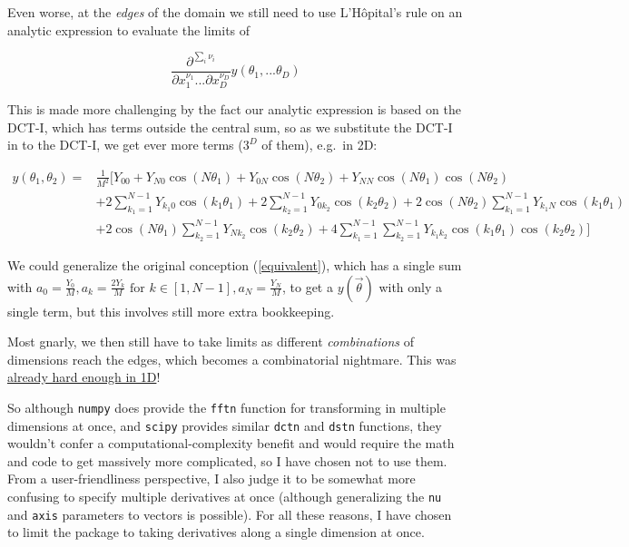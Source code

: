 \documentclass[10pt]{article}
\begin{document}
Even worse, at the \textit{edges} of the domain we still need to use L'Hôpital's rule on an analytic expression to evaluate the limits of

$$\frac{\partial^{\sum_i\nu_i}}{\partial x_1^{\nu_1} ... \partial x_D^{\nu_D}} y(\theta_1, ... \theta_D)$$

This is made more challenging by the fact our analytic expression is based on the DCT-I, which has terms outside the central sum, so as we substitute the DCT-I in to the DCT-I, we get ever more terms ($3^D$ of them), e.g.~in 2D:

\begin{align*}
y(\theta_1, \theta_2) =& \frac{1}{M^2} \Big[ Y_{00} + Y_{N0}\cos(N\theta_1) + Y_{0N}\cos(N\theta_2) + Y_{NN}\cos(N\theta_1)\cos(N\theta_2)\\
&+ 2\sum_{k_1 = 1}^{N-1} Y_{k_1 0} \cos(k_1 \theta_1) + 2\sum_{k_2 = 1}^{N-1} Y_{0 k_2} \cos(k_2 \theta_2) + 2\cos(N\theta_2) \sum_{k_1 = 1}^{N-1} Y_{k_1 N} \cos(k_1 \theta_1)\\
&+ 2\cos(N\theta_1) \sum_{k_2 = 1}^{N-1} Y_{N k_2} \cos(k_2 \theta_2) + 4 \sum_{k_1 = 1}^{N-1} \sum_{k_2 = 1}^{N-1} Y_{k_1 k_2} \cos(k_1 \theta_1) \cos(k_2 \theta_2)\Big]
\end{align*}

We could generalize the original conception (\autoref{equivalent}), which has a single sum with $a_0 = \frac{Y_0}{M}, a_k = \frac{2 Y_k}{M} \text{ for } k \in [1, N-1], a_N = \frac{Y_N}{M}$, to get a $y(\vec{\theta})$ with only a single term, but this involves still more extra bookkeeping.

Most gnarly, we then still have to take limits as different \textit{combinations} of dimensions reach the edges, which becomes a combinatorial nightmare. This was \hyperref[endpoints]{already hard enough in 1D}!

So although \texttt{numpy} does provide the \texttt{fftn} function for transforming in multiple dimensions at once, and \texttt{scipy} provides similar \texttt{dctn} and \texttt{dstn} functions, they wouldn't confer a computational-complexity benefit and would require the math and code to get massively more complicated, so I have chosen not to use them. From a user-friendliness perspective, I also judge it to be somewhat more confusing to specify multiple derivatives at once (although generalizing the \texttt{nu} and \texttt{axis} parameters to vectors is possible). For all these reasons, I have chosen to limit the package to taking derivatives along a single dimension at once.
\end{document}
